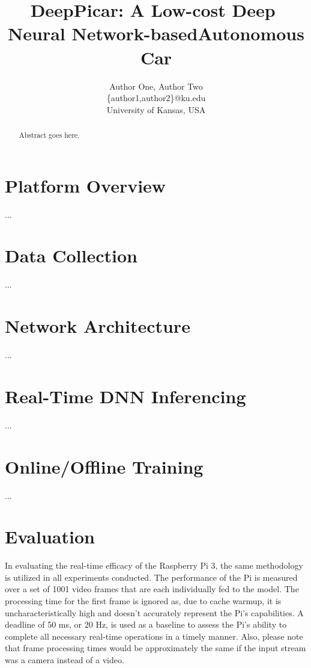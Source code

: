\documentclass[10pt, conference]{IEEEtran}
\begin{document}
\title{DeepPicar:​ ​A​ ​Low-cost​ ​Deep​ ​Neural​ ​Network-based​ ​Autonomous​ ​Car}
\author{Author One, Author Two\\
\{author1,author2\}@ku.edu\\
University of Kansas, USA\\ 
}

\maketitle
\thispagestyle{empty}
\begin{abstract}

Abstract goes here.

\end{abstract}





\section{Platform Overview}
...
\section{Data Collection}
...
\section{Network Architecture}
...
\section{Real-Time DNN Inferencing}
...
\section{Online/Offline Training}
...
\section{Evaluation}
In evaluating the real-time efficacy of the Raspberry Pi 3, the same methodology is utilized in all 
experiments conducted. The performance of the Pi is measured over a set of 1001 video frames that are 
each individually fed to the model. The processing time for the first frame is ignored as, due to 
cache warmup, it is uncharacteristically high and doesn't accurately represent the Pi's capabilities. A 
deadline of 50 ms, or 20 Hz, is used as a baseline to assess the Pi's ability to complete all 
necessary real-time operations in a timely manner. Also, please note that frame processing times 
would be approximately the same if the input stream was a 
camera instead of a video. 
\end{document}
